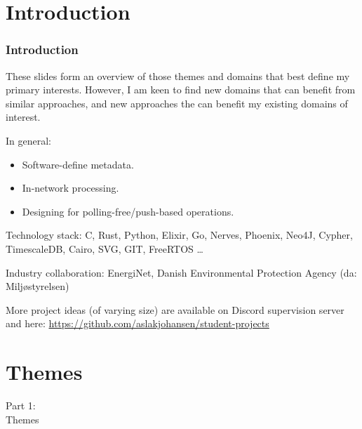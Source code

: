 \section{Introduction}
\begin{frame}
    \frametitle{Introduction}
    \vspace{0mm}
    These slides form an overview of those themes and domains that best define my primary interests. However, I am keen to find new domains that can benefit from similar approaches, and new approaches the can benefit my existing domains of interest.
    
    \vspace{2mm}
    In general:
    \begin{itemize}
      \item Software-define metadata.
      \item In-network processing.
      \item Designing for polling-free/push-based operations.
    \end{itemize}
    
    \vspace{2mm}
    Technology stack: C, Rust, Python, Elixir, Go, Nerves, Phoenix, Neo4J, Cypher, TimescaleDB, Cairo, SVG, GIT, FreeRTOS \ldots
    
    \vspace{2mm}
    Industry collaboration: EnergiNet, Danish Environmental Protection Agency (da: Miljøstyrelsen)
    
    \vspace{2mm}
    More project ideas (of varying size) are available on Discord supervision server and here: \url{https://github.com/aslakjohansen/student-projects}
\end{frame}

\section{Themes}
\begin{frame}
    \vspace{25mm}
    \begin{center}
        \Huge{Part 1:\\Themes}
    \end{center}
\end{frame}

